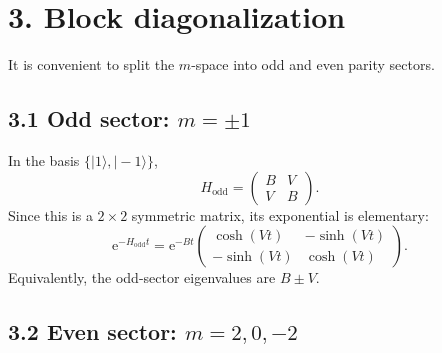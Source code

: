 \documentclass[11pt]{article}
\newcommand{\e}{\mathrm{e}}
\begin{document}
\section*{3. Block diagonalization}

It is convenient to split the $m$-space into odd and even parity sectors.

\subsection*{3.1 Odd sector: $m=\pm1$}

In the basis $\{|1\rangle,|-1\rangle\}$,
\begin{equation}
H_{\mathrm{odd}}=
\begin{pmatrix}
B & V\\
V & B
\end{pmatrix}.
\end{equation}
Since this is a $2\times 2$ symmetric matrix, its exponential is elementary:
\begin{equation}
\e^{-H_{\mathrm{odd}}t}
=
\e^{-Bt}
\begin{pmatrix}
\cosh(Vt) & -\sinh(Vt)\\
-\sinh(Vt) & \cosh(Vt)
\end{pmatrix}.
\end{equation}
Equivalently, the odd-sector eigenvalues are $B\pm V$.

\subsection*{3.2 Even sector: $m=2,0,-2$}
\end{document}
